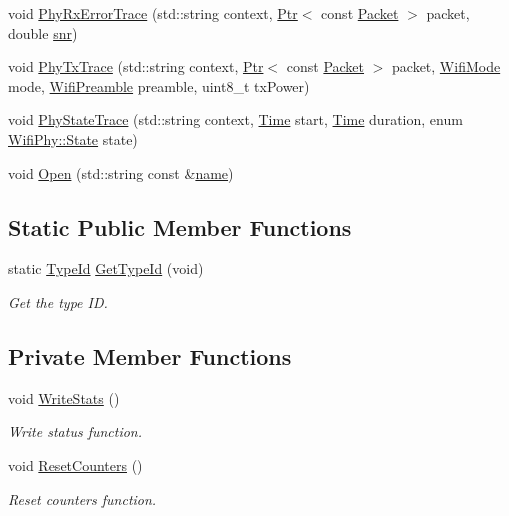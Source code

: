 \begin{DoxyCompactItemize}
\item 
void \hyperlink{classns3_1_1AthstatsWifiTraceSink_a6e65ff0ceae205118fc40867f18988e5}{Phy\+Rx\+Error\+Trace} (std\+::string context, \hyperlink{classns3_1_1Ptr}{Ptr}$<$ const \hyperlink{classns3_1_1Packet}{Packet} $>$ packet, double \hyperlink{lte__pathloss_8m_ae6e82a215dff6b79fb6e9952a1b78453}{snr})
\item 
void \hyperlink{classns3_1_1AthstatsWifiTraceSink_a84f788ebed6522f48a3b36ea173650c2}{Phy\+Tx\+Trace} (std\+::string context, \hyperlink{classns3_1_1Ptr}{Ptr}$<$ const \hyperlink{classns3_1_1Packet}{Packet} $>$ packet, \hyperlink{classns3_1_1WifiMode}{Wifi\+Mode} mode, \hyperlink{group__wifi_ga5e94a56cb338a14ffbbb19c6a41251eb}{Wifi\+Preamble} preamble, uint8\+\_\+t tx\+Power)
\item 
void \hyperlink{classns3_1_1AthstatsWifiTraceSink_afd9ade5a7788f583681de3068d03d1d5}{Phy\+State\+Trace} (std\+::string context, \hyperlink{classns3_1_1Time}{Time} start, \hyperlink{classns3_1_1Time}{Time} duration, enum \hyperlink{classns3_1_1WifiPhy_af97408fa76f99797497b492758467143}{Wifi\+Phy\+::\+State} state)
\item 
void \hyperlink{classns3_1_1AthstatsWifiTraceSink_ad46906e79b348c49476427f19f644a9b}{Open} (std\+::string const \&\hyperlink{generate__test__data__lte__spectrum__model_8m_ab74e6bf80237ddc4109968cedc58c151}{name})
\end{DoxyCompactItemize}
\subsection*{Static Public Member Functions}
\begin{DoxyCompactItemize}
\item 
static \hyperlink{classns3_1_1TypeId}{Type\+Id} \hyperlink{classns3_1_1AthstatsWifiTraceSink_a763d39674b3aae919c3778e3261923f1}{Get\+Type\+Id} (void)
\begin{DoxyCompactList}\small\item\em Get the type ID. \end{DoxyCompactList}\end{DoxyCompactItemize}
\subsection*{Private Member Functions}
\begin{DoxyCompactItemize}
\item 
void \hyperlink{classns3_1_1AthstatsWifiTraceSink_a66673a066cf89b97d66707c06740f7ba}{Write\+Stats} ()
\begin{DoxyCompactList}\small\item\em Write status function. \end{DoxyCompactList}\item 
void \hyperlink{classns3_1_1AthstatsWifiTraceSink_ac37bcc37638183448170c82dce22a64a}{Reset\+Counters} ()
\begin{DoxyCompactList}\small\item\em Reset counters function. \end{DoxyCompactList}\end{DoxyCompactItemize}
